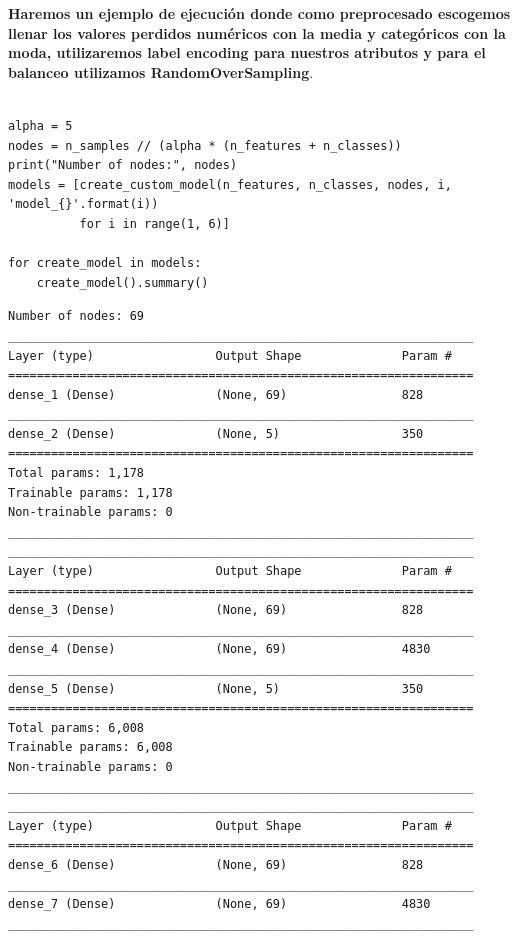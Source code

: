 \documentclass[12pt,twoside]{report}
\begin{document}
\textbf{Haremos un ejemplo de ejecución donde como preprocesado escogemos llenar los valores perdidos numéricos con la media y categóricos con la moda, utilizaremos label encoding para nuestros atributos y para el balanceo utilizamos RandomOverSampling}.\\
\\
\begin{lstlisting}
alpha = 5
nodes = n_samples // (alpha * (n_features + n_classes))
print("Number of nodes:", nodes)
models = [create_custom_model(n_features, n_classes, nodes, i, 'model_{}'.format(i)) 
          for i in range(1, 6)]

for create_model in models:
    create_model().summary()
\end{lstlisting}
\begin{lstlisting}
Number of nodes: 69
_________________________________________________________________
Layer (type)                 Output Shape              Param #   
=================================================================
dense_1 (Dense)              (None, 69)                828       
_________________________________________________________________
dense_2 (Dense)              (None, 5)                 350       
=================================================================
Total params: 1,178
Trainable params: 1,178
Non-trainable params: 0
_________________________________________________________________
_________________________________________________________________
Layer (type)                 Output Shape              Param #   
=================================================================
dense_3 (Dense)              (None, 69)                828       
_________________________________________________________________
dense_4 (Dense)              (None, 69)                4830      
_________________________________________________________________
dense_5 (Dense)              (None, 5)                 350       
=================================================================
Total params: 6,008
Trainable params: 6,008
Non-trainable params: 0
_________________________________________________________________
_________________________________________________________________
Layer (type)                 Output Shape              Param #   
=================================================================
dense_6 (Dense)              (None, 69)                828       
_________________________________________________________________
dense_7 (Dense)              (None, 69)                4830      
_________________________________________________________________

\end{lstlisting}
\end{document}
